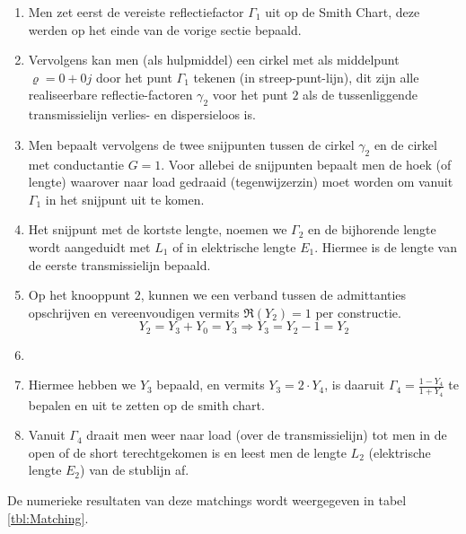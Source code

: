   \begin{enumerate}
   \item Men zet eerst de vereiste reflectiefactor $\Gamma_1$ uit op de Smith
   Chart, deze werden op het einde van de vorige sectie bepaald.
   \item Vervolgens kan men (als hulpmiddel) een cirkel met als middelpunt $\varrho = 0 + 0j$ door
   het punt $\Gamma_1$ tekenen (in streep-punt-lijn), dit zijn alle realiseerbare
   reflectie-factoren $\gamma_2$ voor het punt $2$ als de tussenliggende
   transmissielijn verlies- en dispersieloos is.
   \item Men bepaalt vervolgens de twee snijpunten tussen de cirkel $\gamma_2$
   en de cirkel met conductantie $G = 1$. Voor allebei de snijpunten
   bepaalt men de hoek (of lengte) waarover naar load gedraaid (tegenwijzerzin)
   moet worden om vanuit $\Gamma_1$ in het snijpunt uit te komen.
   \item Het snijpunt met de kortste lengte, noemen we $\Gamma_2$ en de bijhorende
   lengte wordt aangeduidt met $L_1$ of in elektrische lengte $E_1$. Hiermee is
   de lengte van de eerste transmissielijn bepaald.
   \item Op het knooppunt $2$, kunnen we een verband tussen de admittanties opschrijven
   en vereenvoudigen vermits $\Re{(Y_2)} = 1$ per constructie.
   \[
     Y_2 = Y_3 + Y_0 = Y_3 \Rightarrow Y_3 = Y_2 - 1 = Y_2
   \]
   \item {}
   \item Hiermee hebben we $Y_3$ bepaald, en vermits $Y_3 = 2 \cdot Y_4$,
   is daaruit $\Gamma_4 = \frac{1-Y_4}{1+Y_4}$ te bepalen en uit te zetten
   op de smith chart.
   \item Vanuit $\Gamma_4$ draait men weer naar load (over de transmissielijn)
   tot men in de open of de short terechtgekomen is en leest men de lengte
   $L_2$ (elektrische lengte $E_2$) van de stublijn af.   
  \end{enumerate}


  De numerieke resultaten van deze matchings wordt weergegeven in tabel \ref{tbl:Matching}.

